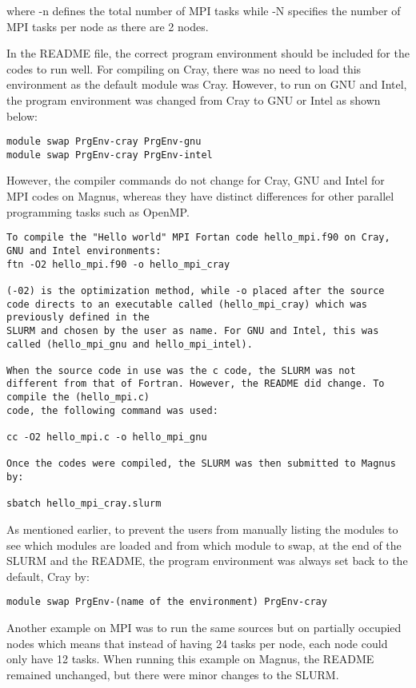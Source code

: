 \documentclass[journal]{IEEEtran}
\begin{document}
where -n defines the total number of MPI tasks while -N specifies the number of MPI tasks per node as there are 2 nodes.

In the README file, the correct program environment should be included for the codes to run well. For compiling on Cray, there was no need to load
this environment as the default module was Cray. However, to run on GNU and Intel, the program environment was changed from Cray to GNU or Intel as
shown below:

\begin{verbatim}
module swap PrgEnv-cray PrgEnv-gnu
module swap PrgEnv-cray PrgEnv-intel
\end{verbatim}

However, the compiler commands do not change for Cray, GNU and Intel for MPI codes on Magnus, whereas they have distinct differences for other parallel
programming tasks such as OpenMP.

\begin{verbatim}
To compile the "Hello world" MPI Fortan code hello_mpi.f90 on Cray, GNU and Intel environments:
ftn -O2 hello_mpi.f90 -o hello_mpi_cray

(-02) is the optimization method, while -o placed after the source code directs to an executable called (hello_mpi_cray) which was previously defined in the
SLURM and chosen by the user as name. For GNU and Intel, this was called (hello_mpi_gnu and hello_mpi_intel). 

When the source code in use was the c code, the SLURM was not different from that of Fortran. However, the README did change. To compile the (hello_mpi.c) 
code, the following command was used: 

cc -O2 hello_mpi.c -o hello_mpi_gnu

Once the codes were compiled, the SLURM was then submitted to Magnus by:

sbatch hello_mpi_cray.slurm 
\end{verbatim}

As mentioned earlier, to prevent the users from manually listing the modules to see which modules are loaded and from which module to swap, at the end
of the SLURM and the README, the program environment was always set back to the default, Cray by:

\begin{verbatim}
module swap PrgEnv-(name of the environment) PrgEnv-cray
\end{verbatim}

Another example on MPI was to run the same sources but on partially occupied nodes which means that instead of having 24 tasks per node, each node could
only have 12 tasks. When running this example on Magnus, the README remained unchanged, but there were minor changes to the SLURM.
\end{document}
